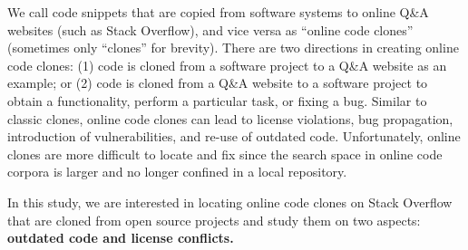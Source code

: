 \documentclass[sigconf,review, anonymous]{acmart}
\newcommand\FIXME[1]{\textbf{FIXME: #1}}
\begin{document}

We call code snippets that are copied from software systems to online
Q\&A websites (such as Stack Overflow), and vice versa as ``online
code clones'' (sometimes only ``clones'' for brevity). There are two
directions in creating online code clones: (1) code is cloned from a software
project to a Q\&A website as an example; or (2) code is cloned from a
Q\&A website to a software project to obtain a functionality, perform
a particular task, or fixing a bug.
Similar to classic clones, online code clones can lead to license
violations, bug propagation, introduction of vulnerabilities, and
re-use of outdated code. Unfortunately, online clones are more
difficult to locate and fix since the search space in online code
corpora is larger and no longer confined in a local repository.

In this study, we are interested in locating online code clones on
Stack Overflow that are cloned from open source projects and study
them on two aspects: \textbf{outdated code and license conflicts.}
\end{document}
